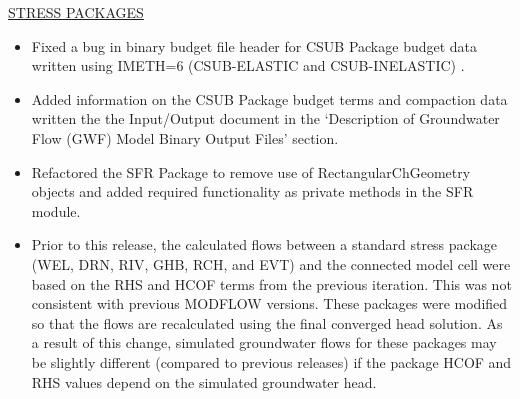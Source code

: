 \documentclass[11pt,twoside,twocolumn]{usgsreport}
\begin{document}
\begin{itemize}
	\underline{STRESS PACKAGES}
	\begin{itemize}
		\item Fixed a bug in binary budget file header for CSUB Package budget data written using IMETH=6 (CSUB-ELASTIC and CSUB-INELASTIC) .
		\item Added information on the CSUB Package budget terms and compaction data written the the Input/Output document in the `Description of Groundwater Flow (GWF) Model Binary Output Files' section.
		\item Refactored the SFR Package to remove use of RectangularChGeometry objects and added required functionality as private methods in the SFR module.
		\item Prior to this release, the calculated flows between a standard stress package (WEL, DRN, RIV, GHB, RCH, and EVT) and the connected model cell were based on the RHS and HCOF terms from the previous iteration.  This was not consistent with previous MODFLOW versions.  These packages were modified so that the flows are recalculated using the final converged head solution.  As a result of this change, simulated groundwater flows for these packages may be slightly different (compared to previous releases) if the package HCOF and RHS values depend on the simulated groundwater head.
	\end{itemize}


\end{itemize}
\end{document}
